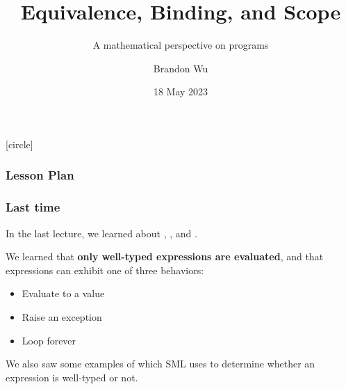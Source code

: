 \documentclass[aspectratio=169]{beamer}
\title{Equivalence, Binding, and Scope} %
\subtitle{A mathematical perspective on programs} %
\date{18 May 2023} %
\author{Brandon Wu} %
\newif\ifcolorlambda
\begin{document}
\ifweb
    \renewcommand{\pause}{}
\fi

[circle]

{
\begin{frame}[plain]
    \colorlambdatrue
    \titlepage
\end{frame}
}

\begin{frame}[fragile]
  \frametitle{Lesson Plan}

  \tableofcontents
\end{frame}

\begin{frame}[fragile]
  \frametitle{Last time}

  In the last lecture, we learned about , , and .

  \pause
  \vspace{5pt}

  We learned that \textbf{only well-typed expressions are evaluated}, and that expressions can 
  exhibit one of three behaviors:

  \pause
  \vspace{\fill}

  \begin{itemize}
    \item Evaluate to a value \pause
    \item Raise an exception \pause
    \item Loop forever
  \end{itemize}

  \pause
  \vspace{\fill}

  We also saw some examples of  which SML uses to determine whether
  an expression is well-typed or not.
\end{frame}

\end{document}
